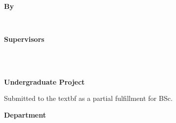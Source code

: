 \begin{center}
    \begin{large}
        \textbf{\MakeUppercase{\ttitle}} \\[1em]
    \end{large}
    \begin{Large}
        \textbf{By} \\
    \end{Large}
    \begin{large}
        \textbf{\tstudents} \\[1em]
    \end{large}
    \begin{Large}
        \textbf{Supervisors} \\[1em]
    \end{Large}
    \begin{large}
        \parbox{\textwidth}{\centering\textbf{\tsupervisors}} \\~\\
    \end{large}
    \begin{Large}
        \textbf{Undergraduate Project} \\
    \end{Large}
    Submitted to the textbf{\tinstitution} \space \tuniversity \space as a partial fulfillment for BSc.\\
    \begin{Large}
        \textbf{\tdepartment \space Department} \\
    \end{Large}
    \begin{Large}
        \textbf{\tmonthAndYearSubmitted}
    \end{Large}
\end{center}

\vspace*{\fill}
